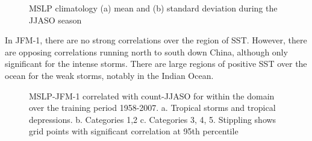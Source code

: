\begin{figure} %

	
	\caption{MSLP climatology (a) mean and (b) standard deviation during the JJASO season}\label{fig:mslp_JJASO}
\end{figure}


In JFM-1, there are no strong correlations over the region of SST. However, there are opposing correlations running north to south down China, although only significant for the intense storms. There are large regions of positive SST over the ocean for the weak storms, notably in the Indian Ocean.


\begin{figure}
	\centering
	
	\caption{MSLP-JFM-1 correlated with count-JJASO for within the domain over the training period 1958-2007. a. Tropical storms and tropical depressions. b. Categories 1,2 c. Categories 3, 4, 5. Stippling shows grid points with significant correlation at 95th percentile} \label{fig:corr_prevJFM_mslp} 
\end{figure} 

